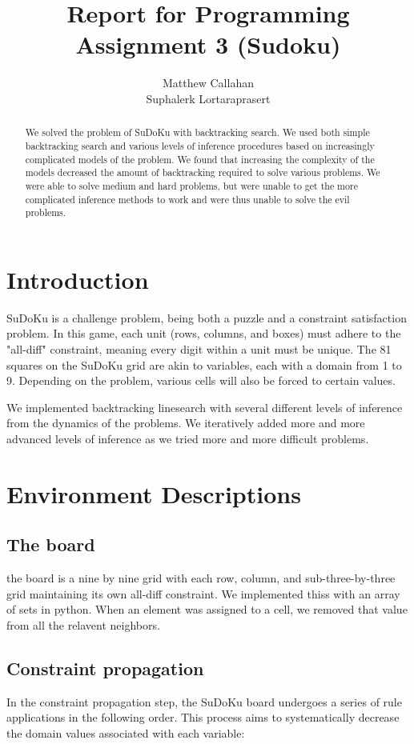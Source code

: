 \documentclass{article}
\title{Report for Programming Assignment 3 (Sudoku)}
\author{%
  Matthew Callahan\\
  \And
  Suphalerk Lortaraprasert
}
\begin{document}
\maketitle


\begin{abstract}
  We solved the problem of SuDoKu with backtracking search. We used both simple backtracking search and various levels of inference procedures based on increasingly complicated models of the problem. We found that increasing the complexity of the models decreased the amount of backtracking required to solve various problems. We were able to solve medium and hard problems, but were unable to get the more complicated inference methods to work and were thus unable to solve the evil problems. 
 \end{abstract}

\section{Introduction}
SuDoKu is a challenge problem, being both a puzzle and a constraint satisfaction problem. In this game, each unit (rows, columns, and boxes) must adhere to the "all-diff" constraint, meaning every digit within a unit must be unique. The 81 squares on the SuDoKu grid are akin to variables, each with a domain from 1 to 9. Depending on the problem, various cells will also be forced to certain values. 

We implemented backtracking linesearch with several different levels of inference from the dynamics of the problems.  We iteratively added more and more advanced levels of inference as we tried more and more difficult problems. 

  
\section{Environment Descriptions}
\subsection{The board}
the board is a nine by nine grid with each row, column, and sub-three-by-three grid maintaining its own all-diff constraint. We implemented thiss with an array of sets in python. When an element was assigned to a cell, we removed that value from all the relavent neighbors. 
\subsection{Constraint propagation}
In the constraint propagation step, the SuDoKu board undergoes a series of rule applications in the following order. This process aims to systematically decrease the domain values associated with each variable:
\end{document}
